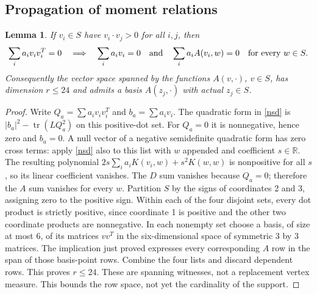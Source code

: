 \documentclass[11pt]{article}
\newtheorem{lemma}[theorem]{Lemma}
\theoremstyle{remark}\newtheorem{remark}[theorem]{Remark}
\newcommand{\R}{\mathbb R}
\DeclareMathOperator{\tr}{tr}
\numberwithin{equation}{section}
\begin{document}
\subsection{Propagation of moment relations}
\begin{lemma}\label{propagate}
If $v_i\in S$ have $v_i\cdot v_j>0$ for all $i,j$, then
\[
 \sum_i a_i v_iv_i^T=0
 \quad\Longrightarrow\quad
 \sum_i a_i v_i=0\quad\hbox{and}\quad
 \sum_i a_i A(v_i,w)=0\quad\hbox{for every }w\in S.
\]
Consequently the vector space spanned by the functions $A(v,\cdot)$, $v\in S$,
has dimension $r\le24$ and admits a basis $A(z_j,\cdot)$ with actual $z_j\in S$.
\end{lemma}
\begin{proof}
Write $Q_a=\sum a_i v_iv_i^T$ and $b_a=\sum a_i v_i$.
The quadratic form in \eqref{nsd} is $|b_a|^2-\tr(LQ_a^2)$ on this positive-dot set.
For $Q_a=0$ it is nonnegative, hence zero and $b_a=0$.
A null vector of a negative semidefinite quadratic form has zero cross terms:
apply \eqref{nsd} also to this list with $w$ appended and coefficient $s\in\R$.
The resulting polynomial $2s\sum_i a_iK(v_i,w)+s^2K(w,w)$ is nonpositive for all $s$,
so its linear coefficient vanishes. The $D$ sum vanishes because $Q_a=0$;
therefore the $A$ sum vanishes for every $w$.
Partition $S$ by the signs of coordinates 2 and 3, assigning zero to the positive sign.
Within each of the four disjoint sets, every dot product is strictly positive,
since coordinate 1 is positive and the other two coordinate products are nonnegative.
In each nonempty set choose a basis, of size at most 6, of its matrices $vv^T$
in the six-dimensional space of symmetric $3$ by $3$ matrices.
The implication just proved expresses every corresponding $A$ row in the span
of those basis-point rows. Combine the four lists and discard dependent rows.
This proves $r\le24$. These are spanning witnesses, not a replacement vertex measure.
This bounds the row space, not yet the cardinality of the support.
\end{proof}
\end{document}

